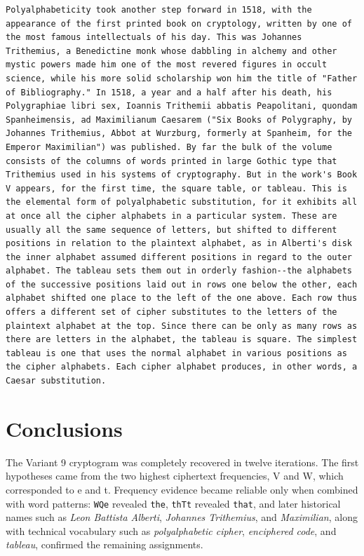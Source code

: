 \documentclass[12pt,a4paper]{article}
\begin{document}
\begin{lstlisting}[caption={Recovered plaintext with restored word spacing}, label={lst:final_plaintext}]
Polyalphabeticity took another step forward in 1518, with the appearance of the first printed book on cryptology, written by one of the most famous intellectuals of his day. This was Johannes Trithemius, a Benedictine monk whose dabbling in alchemy and other mystic powers made him one of the most revered figures in occult science, while his more solid scholarship won him the title of "Father of Bibliography." In 1518, a year and a half after his death, his Polygraphiae libri sex, Ioannis Trithemii abbatis Peapolitani, quondam Spanheimensis, ad Maximilianum Caesarem ("Six Books of Polygraphy, by Johannes Trithemius, Abbot at Wurzburg, formerly at Spanheim, for the Emperor Maximilian") was published. By far the bulk of the volume consists of the columns of words printed in large Gothic type that Trithemius used in his systems of cryptography. But in the work's Book V appears, for the first time, the square table, or tableau. This is the elemental form of polyalphabetic substitution, for it exhibits all at once all the cipher alphabets in a particular system. These are usually all the same sequence of letters, but shifted to different positions in relation to the plaintext alphabet, as in Alberti's disk the inner alphabet assumed different positions in regard to the outer alphabet. The tableau sets them out in orderly fashion--the alphabets of the successive positions laid out in rows one below the other, each alphabet shifted one place to the left of the one above. Each row thus offers a different set of cipher substitutes to the letters of the plaintext alphabet at the top. Since there can be only as many rows as there are letters in the alphabet, the tableau is square. The simplest tableau is one that uses the normal alphabet in various positions as the cipher alphabets. Each cipher alphabet produces, in other words, a Caesar substitution.
\end{lstlisting}

\clearpage

\section{Conclusions}
The Variant 9 cryptogram was completely recovered in twelve iterations. The first hypotheses came from the two highest ciphertext frequencies, V and W, which corresponded to e and t. Frequency evidence became reliable only when combined with word patterns: \texttt{WQe} revealed \texttt{the}, \texttt{thTt} revealed \texttt{that}, and later historical names such as \textit{Leon Battista Alberti}, \textit{Johannes Trithemius}, and \textit{Maximilian}, along with technical vocabulary such as \textit{polyalphabetic cipher}, \textit{enciphered code}, and \textit{tableau}, confirmed the remaining assignments.
\end{document}
